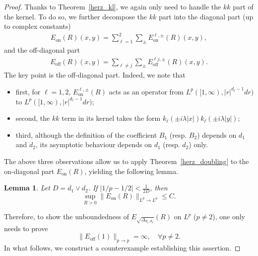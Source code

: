 \documentclass[10pt,a4paper]{amsart}
\newtheorem{lemma}{Lemma}
\newcommand\Lapd{\Delta_{d_1, d_2}}
\begin{document}
\begin{proof}
Thanks to Theorem~\ref{herz_kl}, we again only need to handle the $kk$ part of the kernel. To do so, we further decompose the $kk$ part into the diagonal part (up to complex constants)
\begin{align*}
    E_{\mathrm{on}}(R)(x,y) = \sum_{\ell=1}^2 \sum_{\pm} E_{\mathrm{on}}^{\ell,\pm}(R)(x,y),
\end{align*}
and the off-diagonal part
\begin{align*}
    E_{\mathrm{off}}(R)(x,y) = \sum_{\ell \ne j} \sum_{\pm} E_{\mathrm{off}}^{\ell j, \pm}(R)(x,y).
\end{align*}
The key point is the off-diagonal part. Indeed, we note that 
\begin{itemize}
    \item first, for $\ell=1,2$, $E_{\mathrm{on}}^{\ell,\pm}(R)$ acts as an operator from $L^p([1,\infty),|r|^{d_\ell-1} dr)$ to $L^p([1,\infty),|r|^{d_\ell-1} dr)$;
    \item second, the $kk$ term in its kernel takes the form $k_\ell(\pm i\lambda|x|)k_\ell(\pm i\lambda|y|)$;
    \item third, although the definition of the coefficient $B_1$ (resp. $B_2$) depends on $d_1$ and $d_2$, its asymptotic behaviour depends on $d_1$ (resp. $d_2$) only. 
\end{itemize}
The above three observations allow us to apply Theorem~\ref{herz_doubling} to the on-diagonal part $E_{\mathrm{on}}(R)$, yielding the following lemma.



\begin{lemma}\label{fefferman-on-diag}
Let \(D=d_1\vee d_2\). If
\(\left|1/p-1/2\right|<\frac1{2D}\), then
\[
\sup_{R>0}\|E_{\mathrm{on}}(R)\|_{L^p\to L^p}\leq C.
\]
\end{lemma}

Therefore, to show the unboundedness of $E_{\sqrt{\Lapd}}(R)$ on $L^p$ ($p\ne 2$), one only needs to prove
\begin{equation}\label{claim}
    \| E_{\mathrm{off}}(1)\|_{p \to p} = \infty,\quad \forall p\ne 2.
\end{equation}
In what follows,
we construct a counterexample establishing this assertion.


\end{proof}
\end{document}

